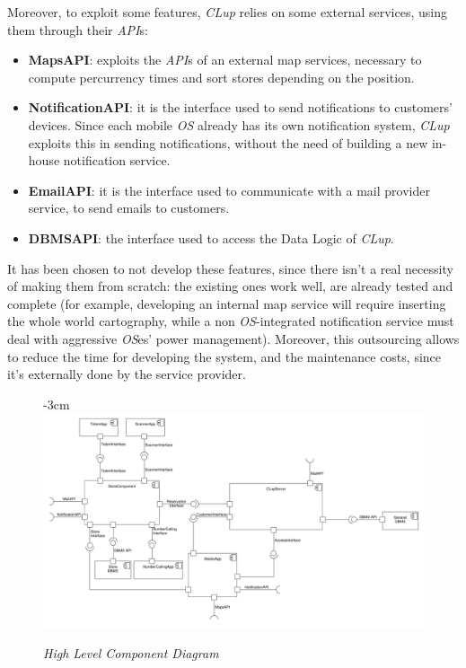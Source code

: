 \documentclass{article}
\begin{document}
		Moreover, to exploit some features, \emph{CLup} relies on some external services, using them through their \emph{API}s:
		
		\begin{itemize}
			\item {\bfseries MapsAPI}: exploits the \emph{API}s of an external map services, necessary to compute percurrency times and sort stores depending on the position.
			
			\item {\bfseries NotificationAPI}: it is the interface used to send notifications to customers’ devices. Since each mobile \emph{OS} already has its own notification system, \emph{CLup} exploits this in sending notifications, without the need of building a new in-house notification service.
			
			\item {\bfseries EmailAPI}: it is the interface used to communicate with a mail provider service, to send emails to customers.
			
			\item {\bfseries DBMSAPI}: the interface used to access the Data Logic of \emph{CLup}.
		\end{itemize}
	
		It has been chosen to not develop these features, since there isn’t a real necessity of making them from scratch: the existing ones work well, are already tested and complete (for example, developing an internal map service will require inserting the whole world cartography, while a non \emph{OS}-integrated notification service must deal with aggressive \emph{OS}es’ power management). Moreover, this outsourcing allows to reduce the time for developing the system, and the maintenance costs, since it’s externally done by the service provider.
		
		

		\begin{figure}
			\begin{adjustwidth} {-3cm}{}
				\centering
				\includegraphics[scale=0.35, angle=90, trim= 0 0 0 -5cm]{Component Diagrams/HighLevelComponentDiagram.pdf}\\
			\end{adjustwidth}
			\caption{\emph{High Level Component Diagram}}
		\end{figure}
		\newpage
		
\end{document}

